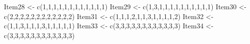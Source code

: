 \documentclass[
  english,
]{book}
\newenvironment{Shaded}{\begin{snugshade}}{\end{snugshade}}
\newcommand{\DecValTok}[1]{\textcolor[rgb]{0.00,0.00,0.81}{#1}}
\newcommand{\FunctionTok}[1]{\textcolor[rgb]{0.00,0.00,0.00}{#1}}
\newcommand{\NormalTok}[1]{#1}
\newcommand{\OtherTok}[1]{\textcolor[rgb]{0.56,0.35,0.01}{#1}}
\begin{document}
\begin{Shaded}
\begin{Highlighting}[]
\NormalTok{Item28 }\OtherTok{\textless{}{-}} \FunctionTok{c}\NormalTok{(}\DecValTok{1}\NormalTok{,}\DecValTok{1}\NormalTok{,}\DecValTok{1}\NormalTok{,}\DecValTok{1}\NormalTok{,}\DecValTok{1}\NormalTok{,}\DecValTok{1}\NormalTok{,}\DecValTok{1}\NormalTok{,}\DecValTok{1}\NormalTok{,}\DecValTok{1}\NormalTok{,}\DecValTok{1}\NormalTok{,}\DecValTok{1}\NormalTok{,}\DecValTok{1}\NormalTok{)}
\NormalTok{Item29 }\OtherTok{\textless{}{-}} \FunctionTok{c}\NormalTok{(}\DecValTok{1}\NormalTok{,}\DecValTok{3}\NormalTok{,}\DecValTok{1}\NormalTok{,}\DecValTok{1}\NormalTok{,}\DecValTok{1}\NormalTok{,}\DecValTok{1}\NormalTok{,}\DecValTok{1}\NormalTok{,}\DecValTok{1}\NormalTok{,}\DecValTok{1}\NormalTok{,}\DecValTok{1}\NormalTok{,}\DecValTok{1}\NormalTok{,}\DecValTok{1}\NormalTok{)}
\NormalTok{Item30 }\OtherTok{\textless{}{-}} \FunctionTok{c}\NormalTok{(}\DecValTok{2}\NormalTok{,}\DecValTok{2}\NormalTok{,}\DecValTok{2}\NormalTok{,}\DecValTok{2}\NormalTok{,}\DecValTok{2}\NormalTok{,}\DecValTok{2}\NormalTok{,}\DecValTok{2}\NormalTok{,}\DecValTok{2}\NormalTok{,}\DecValTok{2}\NormalTok{,}\DecValTok{2}\NormalTok{,}\DecValTok{2}\NormalTok{,}\DecValTok{2}\NormalTok{)}
\NormalTok{Item31 }\OtherTok{\textless{}{-}} \FunctionTok{c}\NormalTok{(}\DecValTok{1}\NormalTok{,}\DecValTok{1}\NormalTok{,}\DecValTok{1}\NormalTok{,}\DecValTok{2}\NormalTok{,}\DecValTok{1}\NormalTok{,}\DecValTok{1}\NormalTok{,}\DecValTok{3}\NormalTok{,}\DecValTok{1}\NormalTok{,}\DecValTok{1}\NormalTok{,}\DecValTok{1}\NormalTok{,}\DecValTok{1}\NormalTok{,}\DecValTok{2}\NormalTok{)}
\NormalTok{Item32 }\OtherTok{\textless{}{-}} \FunctionTok{c}\NormalTok{(}\DecValTok{1}\NormalTok{,}\DecValTok{1}\NormalTok{,}\DecValTok{3}\NormalTok{,}\DecValTok{1}\NormalTok{,}\DecValTok{1}\NormalTok{,}\DecValTok{1}\NormalTok{,}\DecValTok{3}\NormalTok{,}\DecValTok{1}\NormalTok{,}\DecValTok{1}\NormalTok{,}\DecValTok{1}\NormalTok{,}\DecValTok{1}\NormalTok{,}\DecValTok{1}\NormalTok{)}
\NormalTok{Item33 }\OtherTok{\textless{}{-}} \FunctionTok{c}\NormalTok{(}\DecValTok{3}\NormalTok{,}\DecValTok{3}\NormalTok{,}\DecValTok{3}\NormalTok{,}\DecValTok{3}\NormalTok{,}\DecValTok{3}\NormalTok{,}\DecValTok{3}\NormalTok{,}\DecValTok{3}\NormalTok{,}\DecValTok{3}\NormalTok{,}\DecValTok{3}\NormalTok{,}\DecValTok{3}\NormalTok{,}\DecValTok{3}\NormalTok{,}\DecValTok{3}\NormalTok{)}
\NormalTok{Item34 }\OtherTok{\textless{}{-}} \FunctionTok{c}\NormalTok{(}\DecValTok{3}\NormalTok{,}\DecValTok{3}\NormalTok{,}\DecValTok{3}\NormalTok{,}\DecValTok{3}\NormalTok{,}\DecValTok{3}\NormalTok{,}\DecValTok{3}\NormalTok{,}\DecValTok{3}\NormalTok{,}\DecValTok{3}\NormalTok{,}\DecValTok{3}\NormalTok{,}\DecValTok{3}\NormalTok{,}\DecValTok{3}\NormalTok{,}\DecValTok{3}\NormalTok{)}

\end{Highlighting}
\end{Shaded}
\end{document}
